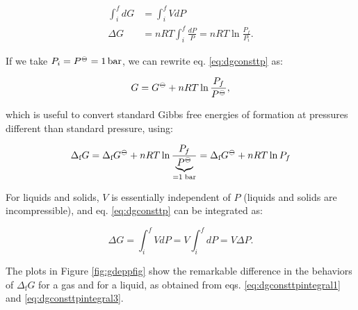 \documentclass[
]{book}
\theoremstyle{definition}
\theoremstyle{definition}
\theoremstyle{definition}
\theoremstyle{remark}
\begin{document}
\begin{equation}
\begin{aligned}
\int_i^f dG &= \int_i^f VdP \\
\Delta G &= nRT \int_i^f \frac{dP}{P} = nRT \ln \frac{P_f}{P_i}.
\end{aligned}
\label{eq:dgconsttpintegral1}
\end{equation}

If we take \(P_i = P^{-\kern-6pt{\ominus}\kern-6pt-}= 1 \, \text{bar}\), we can rewrite eq. \eqref{eq:dgconsttp} as:

\begin{equation}
G = G^{-\kern-6pt{\ominus}\kern-6pt-}+ nRT \ln \frac{P_f}{P^{-\kern-6pt{\ominus}\kern-6pt-}},
\label{eq:dgconsttpintegral2}
\end{equation}

which is useful to convert standard Gibbs free energies of formation at pressures different than standard pressure, using:

\begin{equation}
\Delta_{\text{f}} G = \Delta_{\text{f}} G^{-\kern-6pt{\ominus}\kern-6pt-}+ nRT \ln \frac{P_f}{\underbrace{P^{-\kern-6pt{\ominus}\kern-6pt-}}_{=1 \; \text{bar}}} = \Delta_{\text{f}} G^{-\kern-6pt{\ominus}\kern-6pt-}+ nRT \ln P_f
\label{eq:dgconsttpintegral2b}
\end{equation}

For liquids and solids, \(V\) is essentially independent of \(P\) (liquids and solids are incompressible), and eq. \eqref{eq:dgconsttp} can be integrated as:

\begin{equation}
\Delta G = \int_i^f VdP = V \int_i^f dP = V \Delta P.
\label{eq:dgconsttpintegral3}
\end{equation}

The plots in Figure \ref{fig:gdeppfig} show the remarkable difference in the behaviors of \(\Delta_{\text{f}} G\) for a gas and for a liquid, as obtained from eqs. \eqref{eq:dgconsttpintegral1} and \eqref{eq:dgconsttpintegral3}.
\end{document}
